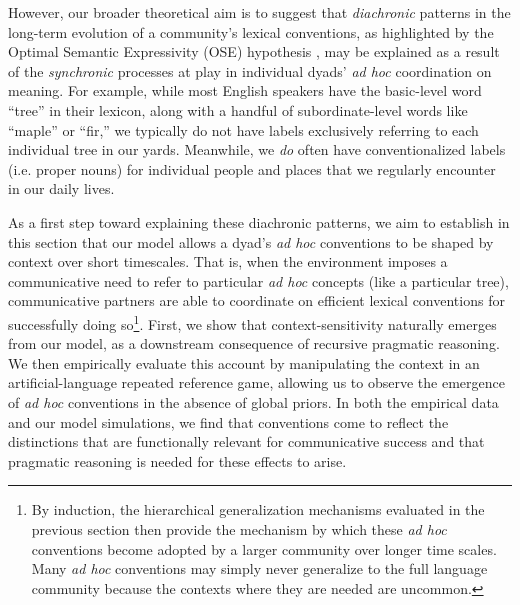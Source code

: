 However, our broader theoretical aim is to suggest that \emph{diachronic} patterns in the long-term evolution of a community's lexical conventions, as highlighted by the Optimal Semantic Expressivity (OSE) hypothesis \cite{frankblogpost}, may be explained as a result of the \emph{synchronic} processes at play in individual dyads' \emph{ad hoc} coordination on meaning.
For example, while most English speakers have the basic-level word ``tree'' in their lexicon, along with a handful of subordinate-level words like ``maple'' or ``fir,'' we typically do not have labels exclusively referring to each individual tree in our yards.
Meanwhile, we \emph{do} often have conventionalized labels (i.e. proper nouns) for individual people and places that we regularly encounter in our daily lives. 

As a first step toward explaining these diachronic patterns, we aim to establish in this section that our model allows a dyad's \emph{ad hoc} conventions to be shaped by context over short timescales.
That is, when the environment imposes a communicative need to refer to particular \emph{ad hoc} concepts (like a particular tree), communicative partners are able to coordinate on efficient lexical conventions for successfully doing so\footnote{By induction, the hierarchical generalization mechanisms evaluated in the previous section then provide the mechanism by which these \emph{ad hoc} conventions become adopted by a larger community over longer time scales. Many \emph{ad hoc} conventions may simply never generalize to the full language community because the contexts where they are needed are uncommon.}.
First, we show that context-sensitivity naturally emerges from our model, as a downstream consequence of recursive pragmatic reasoning.
We then empirically evaluate this account by manipulating the context in an artificial-language repeated reference game, allowing us to observe the emergence of \emph{ad hoc} conventions in the absence of global priors.
In both the empirical data and our model simulations, we find that conventions come to reflect the distinctions that are functionally relevant for communicative success and that pragmatic reasoning is needed for these effects to arise. 

